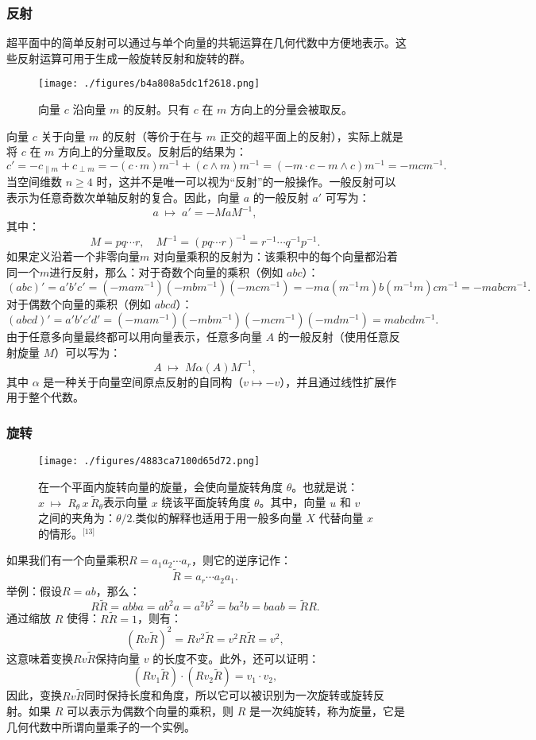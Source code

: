 \subsubsection{反射}
超平面中的简单反射可以通过与单个向量的共轭运算在几何代数中方便地表示。这些反射运算可用于生成一般旋转反射和旋转的群。
\begin{figure}[ht]
\centering
\texttt{[image: ./figures/b4a808a5dc1f2618.png]}
\caption{向量 $c$ 沿向量 $m$ 的反射。只有 $c$ 在 $m$ 方向上的分量会被取反。} \label{fig_jiheds_7}
\end{figure}
向量 $c$ 关于向量 $m$ 的反射（等价于在与 $m$ 正交的超平面上的反射），实际上就是将 $c$ 在 $m$ 方向上的分量取反。反射后的结果为：
$$
c' = -c_{\parallel m} + c_{\perp m}  
    = -(c \cdot m)m^{-1} + (c \wedge m)m^{-1}  
    = (-m \cdot c - m \wedge c)m^{-1}  
    = -m c m^{-1}.~
$$
当空间维数 $n \geq 4$ 时，这并不是唯一可以视为“反射”的一般操作。一般反射可以表示为任意奇数次单轴反射的复合。因此，向量 $a$ 的一般反射 $a'$ 可写为：
$$
a \;\mapsto\; a' = - M a M^{-1},~
$$
其中：
$$
M = p q \cdots r, \quad
M^{-1} = (p q \cdots r)^{-1} = r^{-1} \cdots q^{-1} p^{-1}.~
$$
如果定义沿着一个非零向量$m$ 对向量乘积的反射为：该乘积中的每个向量都沿着同一个$m$进行反射，那么：对于奇数个向量的乘积（例如 $a b c$）：
  $$
  (abc)' = a'b'c' 
  = (-mam^{-1})(-mbm^{-1})(-mcm^{-1}) 
  = -ma(m^{-1}m)b(m^{-1}m)cm^{-1} 
  = -mabc m^{-1}.~
  $$
对于偶数个向量的乘积（例如 $a b c d$）：
  $$
  (abcd)' = a'b'c'd'
  = (-mam^{-1})(-mbm^{-1})(-mcm^{-1})(-mdm^{-1})
  = m a b c d m^{-1}.~
  $$
由于任意多向量最终都可以用向量表示，任意多向量 $A$ 的一般反射（使用任意反射旋量 $M$）可以写为：
$$
A \;\mapsto\; M \alpha(A) M^{-1},~
$$
其中 $\alpha$ 是一种关于向量空间原点反射的自同构（$v \mapsto -v$），并且通过线性扩展作用于整个代数。
\subsubsection{旋转}
\begin{figure}[ht]
\centering
\texttt{[image: ./figures/4883ca7100d65d72.png]}
\caption{在一个平面内旋转向量的旋量，会使向量旋转角度 $\theta$。也就是说：$x \;\mapsto\; R_{\theta} \, x \, \widetilde{R}_{\theta}$表示向量 $x$ 绕该平面旋转角度 $\theta$。其中，向量 $u$ 和 $v$ 之间的夹角为：$\theta / 2.$类似的解释也适用于用一般多向量 $X$ 代替向量 $x$ 的情形。\(^\text{[13]}\)} \label{fig_jiheds_8}
\end{figure}
如果我们有一个向量乘积$R = a_1 a_2 \cdots a_r$，则它的逆序记作：
$$
\widetilde{R} = a_r \cdots a_2 a_1.~
$$
举例：假设$R = a b$，那么：
$$
R \widetilde{R} = a b b a = a b^2 a = a^2 b^2 = b a^2 b = b a a b = \widetilde{R} R.~
$$
通过缩放 $R$ 使得：$R \widetilde{R} = 1$，则有：
$$
(R v \widetilde{R})^2 = R v^2 \widetilde{R} = v^2 R \widetilde{R} = v^2,~
$$
这意味着变换$R v \widetilde{R}$保持向量 $v$ 的长度不变。此外，还可以证明：
$$
(R v_1 \widetilde{R}) \cdot (R v_2 \widetilde{R}) = v_1 \cdot v_2,~
$$
因此，变换$R v \widetilde{R}$同时保持长度和角度，所以它可以被识别为一次旋转或旋转反射。如果 $R$ 可以表示为偶数个向量的乘积，则 $R$ 是一次纯旋转，称为旋量，它是几何代数中所谓向量乘子的一个实例。

